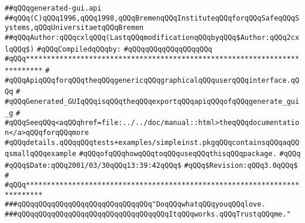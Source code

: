 \label{src/lib/tk/src/toolkit/generated-gui.api}
\verb|##qQQqgenerated-gui.api|\newline
\verb|##qQQq(C)qQQq1996,qQQq1998,qQQqBremenqQQqInstituteqQQqforqQQqSafeqQQqSystems,qQQqUniversitaetqQQqBremen|\newline
\verb|##qQQqAuthor:qQQqcxlqQQq(LastqQQqmodificationqQQqbyqQQq$Author:qQQq2cxlqQQq$)|\newline
\newline
\verb|#qQQqCompiledqQQqby:|\newline
\verb|#qQQqqQQqqQQqqQQqqQQq|\newline
\newline
\newline
\newline
\verb|#qQQq**************************************************************************|\newline
\verb|#|\newline
\verb|#qQQqApiqQQqforqQQqtheqQQqgenericqQQqgraphicalqQQquserqQQqinterface.qQQq|\newline
\verb|#|\newline
\verb|#qQQqGenerated_GUIqQQqisqQQqtheqQQqexportqQQqapiqQQqofqQQqgenerate_gui_g|\newline
\verb|#|\newline
\verb|#qQQqSeeqQQq<aqQQqhref=file:../../doc/manual::html>theqQQqdocumentation</a>qQQqforqQQqmore|\newline
\verb|#qQQqdetails.qQQqqQQqtests+examples/simpleinst.pkgqQQqcontainsqQQqaqQQqsmallqQQqexample|\newline
\verb|#qQQqofqQQqhowqQQqtoqQQquseqQQqthisqQQqpackage.|\newline
\verb|#qQQq|\newline
\verb|#qQQq$Date:qQQq2001/03/30qQQq13:39:42qQQq$|\newline
\verb|#qQQq$Revision:qQQq3.0qQQq$|\newline
\verb|#|\newline
\verb|#qQQq**************************************************************************|\newline
\newline
\newline
\newline
\verb|###qQQqqQQqqQQqqQQqqQQqqQQqqQQqqQQq"DoqQQqwhatqQQqyouqQQqlove.|\newline
\verb|###qQQqqQQqqQQqqQQqqQQqqQQqqQQqqQQqqQQqItqQQqworks.qQQqTrustqQQqme."|\newline
